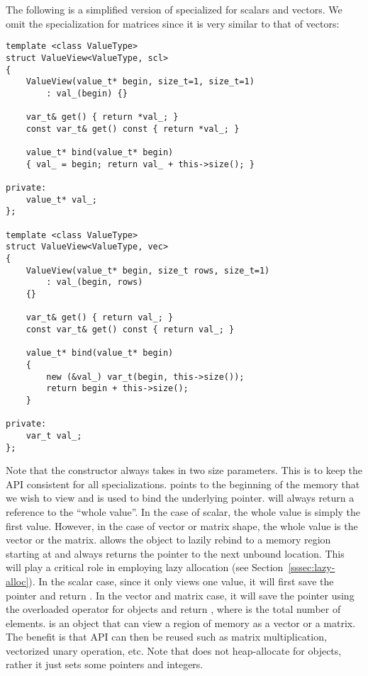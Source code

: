 The following is a simplified version of  specialized for scalars and vectors.
We omit the specialization for matrices since it is very similar to that of vectors:
\begin{lstlisting}[style=customcpp]
template <class ValueType>
struct ValueView<ValueType, scl>
{
    ValueView(value_t* begin, size_t=1, size_t=1)
        : val_(begin) {}

    var_t& get() { return *val_; }
    const var_t& get() const { return *val_; }

    value_t* bind(value_t* begin)
    { val_ = begin; return val_ + this->size(); }

private:
    value_t* val_;
};

template <class ValueType>
struct ValueView<ValueType, vec>
{
    ValueView(value_t* begin, size_t rows, size_t=1)
        : val_(begin, rows)
    {}
     
    var_t& get() { return val_; }
    const var_t& get() const { return val_; }

    value_t* bind(value_t* begin)
    { 
        new (&val_) var_t(begin, this->size());
        return begin + this->size(); 
    }

private:
    var_t val_;
};
\end{lstlisting}
Note that the constructor always takes in two size parameters.
This is to keep the API consistent for all specializations.
 points to the beginning of the memory that we wish to view
and is used to bind the underlying pointer.
 will always return a reference to the ``whole value''.
In the case of scalar, the whole value is simply the first value.
However, in the case of vector or matrix shape, the whole value is the vector or the matrix.
 allows the object to lazily rebind to a memory region
starting at  and always returns the pointer to the next unbound location.
This will play a critical role in employing lazy allocation (see Section~\ref{sssec:lazy-alloc}).
In the scalar case, since it only views one value, 
it will first save the pointer  and return .
In the vector and matrix case, it will save the pointer 
using the overloaded  operator for  objects and return ,
where  is the total number of elements.
 is an object that can view a region of memory as a vector or a matrix.
The benefit is that  API can then be reused such as 
matrix multiplication, vectorized unary operation, etc.
Note that  does not heap-allocate for  objects, 
rather it just sets some pointers and integers.
